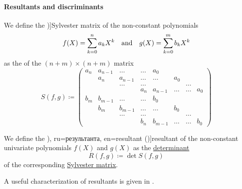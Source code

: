 \paragraph{Resultants and discriminants}

\begin{definition}\label{def:sylvester_matrix}
  We define the \term[ru=матрица Сильвестра, en=Sylvester's matrix (\cite[def. 3.6.2]{CoxLittleOShea2015AlgGeometry})]{Sylvester matrix} of the non-constant polynomials
  \begin{align*}
    f(X) = \sum_{k=0}^n a_k X^k
    &&\T{and}&&
    g(X) = \sum_{k=0}^m b_k X^k
  \end{align*}
  as the  of the \( (n + m) \times (n + m) \) matrix
  \begin{equation*}
    S(f, g) \coloneqq
    \begin{pmatrix}
      a_n    & a_{n-1} & \ldots  & \ldots  & a_0     &        &        &        \\
             & a_n     & a_{n-1} & \ldots  & \ldots  & a_0    &        &        \\
             &         & \ldots  & \ldots  &         &        & \ldots &        \\
             &         &         & a_n     & a_{n-1} & \ldots & \ldots & a_0    \\
      b_m    & b_{m-1} & \ldots  & \ldots  & b_0     &        &        &        \\
             & b_m     & b_{m-1} & \ldots  & \ldots  & b_0    &        &        \\
             &         & \ldots  & \ldots  &         &        & \ldots &        \\
             &         &         & b_n     & b_{m-1} & \ldots & \ldots & b_0
    \end{pmatrix}
  \end{equation*}
\end{definition}

\begin{definition}\label{def:resultant}
  We define the \term[bg=резултанта (\cite[198]{Обрешков1962ВисшаАлгебра}), ru=результанта, en=resultant (\cite[def. 3.6.2]{CoxLittleOShea2015AlgGeometry})]{resultant} of the non-constant univariate polynomials \( f(X) \) and \( g(X) \) as the \hyperref[def:matrix_determinant]{determinant}
  \begin{equation*}
    R(f, g) \coloneqq \det S(f, g)
  \end{equation*}
  of the corresponding \hyperref[def:sylvester_matrix]{Sylvester matrix}.
\end{definition}
\begin{comments}
  \item A useful characterization of resultants is given in .
\end{comments}

